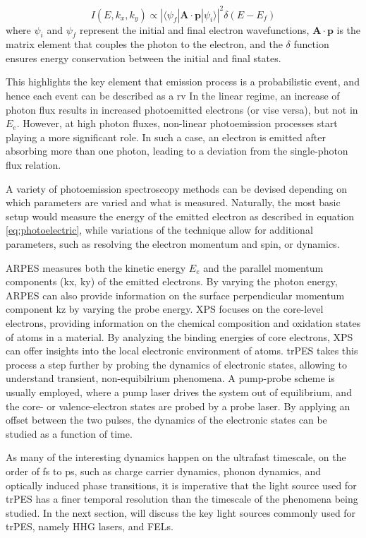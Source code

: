 \begin{equation}
    I(E, k_x, k_y) \propto |\langle \psi_f | \mathbf{A} \cdot \mathbf{p} | \psi_i \rangle|^2 \delta(E - E_f)
\end{equation}
where $\psi_i$ and $\psi_f$ represent the initial and final electron wavefunctions, $\mathbf{A} \cdot \mathbf{p}$ is the matrix element that couples the photon to the electron, and the $\delta$ function ensures energy conservation between the initial and final states.

This highlights the key element that emission process is a probabilistic event, and hence each event can be described as a \gls{rv} 
In the linear regime, an increase of photon flux results in increased photoemitted electrons (or vise versa), but not in $E_e$. However, at high photon fluxes, non-linear photoemission processes start playing a more significant role. In such a case, an electron is emitted after absorbing more than one photon, leading to a deviation from the single-photon flux relation. 

A variety of photoemission spectroscopy methods can be devised depending on which parameters are varied and what is measured. Naturally, the most basic setup would measure the energy of the emitted electron as described in equation \ref{eq:photoelectric}, while variations of the technique allow for additional parameters, such as resolving the electron momentum and spin, or dynamics.

\Gls{ARPES} measures both the kinetic energy $E_e$ and the parallel momentum components (\gls{kx}, \gls{ky}) of the emitted electrons. By varying the photon energy, \gls{ARPES} can also provide information on the surface perpendicular momentum component \gls{kz} by varying the probe energy. \Gls{XPS} focuses on the core-level electrons, providing information on the chemical composition and oxidation states of atoms in a material. By analyzing the binding energies of core electrons, \gls{XPS} can offer insights into the local electronic environment of atoms. \Gls{trPES} takes this process a step further by probing the dynamics of electronic states, allowing to understand transient, non-equibilrium phenomena. A pump-probe scheme is usually employed, where a pump laser drives the system out of equilibrium, and the core- or valence-electron states are probed by a probe laser. By applying an offset between the two pulses, the dynamics of the electronic states can be studied as a function of time.

As many of the interesting dynamics happen on the ultrafast timescale, on the order of \unit{fs} to \unit{ps}, such as charge carrier dynamics, phonon dynamics, and optically induced phase transitions, it is imperative that the light source used for \gls{trPES} has a finer temporal resolution than the timescale of the phenomena being studied. In the next section, will discuss the key light sources commonly used for \gls{trPES}, namely \gls{HHG} lasers, and \glspl{FEL}.

